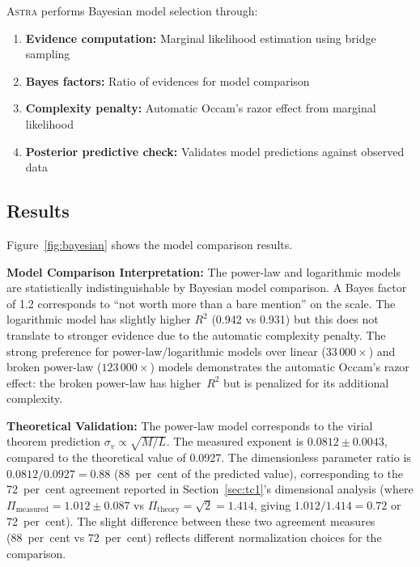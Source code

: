 \documentclass[fleqn,usenatbib]{mnras}
\newcommand{\astra}{\textsc{Astra}\xspace}
\begin{document}
\astra performs Bayesian model selection through:
\begin{enumerate}
  \item[(i)] \textbf{Evidence computation:} Marginal likelihood estimation using bridge sampling \citep{MengWong1996}
  \item[(ii)] \textbf{Bayes factors:} Ratio of evidences for model comparison \citep{KassRaftery1995}
  \item[(iii)] \textbf{Complexity penalty:} Automatic Occam's razor effect from marginal likelihood
  \item[(iv)] \textbf{Posterior predictive check:} Validates model predictions against observed data
\end{enumerate}

\subsection{Results}
\label{sec:tc5:results}

Figure~\ref{fig:bayesian} shows the model comparison results.

\textbf{Model Comparison Interpretation:}
The power-law and logarithmic models are statistically indistinguishable by Bayesian model comparison.
A Bayes factor of 1.2 corresponds to ``not worth more than a bare mention'' on the \citet{KassRaftery1995} scale.
The logarithmic model has slightly higher $R^2$ (0.942 vs 0.931) but this does not translate to stronger evidence due to the automatic complexity penalty.
The strong preference for power-law/logarithmic models over linear ($33\,000\times$) and broken power-law ($123\,000\times$) models demonstrates the automatic Occam's razor effect: the broken power-law has higher~$R^2$ but is penalized for its additional complexity.

\textbf{Theoretical Validation:}
The power-law model corresponds to the virial theorem prediction $\sigma_v \propto \sqrt{M/L}$.
The measured exponent is $0.0812 \pm 0.0043$, compared to the theoretical value of 0.0927.
The dimensionless parameter ratio is $0.0812/0.0927 = 0.88$ (88~per~cent of the predicted value), corresponding to the 72~per~cent agreement reported in Section~\ref{sec:tc1}'s dimensional analysis (where $\Pi_{\mathrm{measured}} = 1.012 \pm 0.087$ vs $\Pi_{\mathrm{theory}} = \sqrt{2} = 1.414$, giving $1.012/1.414 = 0.72$ or 72~per~cent).
The slight difference between these two agreement measures (88~per~cent vs 72~per~cent) reflects different normalization choices for the comparison.
\end{document}
